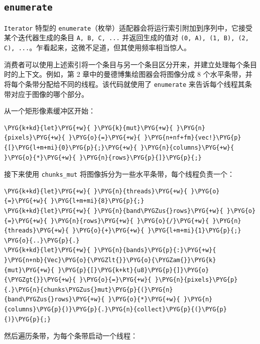 \subsection{\texttt{enumerate}}

\texttt{Iterator} 特型的 \texttt{enumerate}（枚举）适配器会将运行索引附加到序列中，它接受某个迭代器生成的条目 \texttt{A, B, C, ...} 并返回生成的值对 \texttt{(0, A), (1, B), (2, C), ...}。乍看起来，这微不足道，但其使用频率相当惊人。

消费者可以使用上述索引将一个条目与另一个条目区分开来，并建立处理每个条目时的上下文。例如，第 2 章中的曼德博集绘图器会将图像分成 8 个水平条带，并将每个条带分配给不同的线程。该代码就使用了 \texttt{enumerate} 来告诉每个线程其条带对应于图像的哪个部分。

从一个矩形像素缓冲区开始：

\begin{Verbatim}[commandchars=\\\{\},breaklines=true,breakanywhere=true,fontsize=\codefont,xleftmargin=17bp]
\PYG{k+kd}{let}\PYG{+w}{ }\PYG{k}{mut}\PYG{+w}{ }\PYG{n}{pixels}\PYG{+w}{ }\PYG{o}{=}\PYG{+w}{ }\PYG{n+nf+fm}{vec!}\PYG{p}{[}\PYG{l+m+mi}{0}\PYG{p}{;}\PYG{+w}{ }\PYG{n}{columns}\PYG{+w}{ }\PYG{o}{*}\PYG{+w}{ }\PYG{n}{rows}\PYG{p}{]}\PYG{p}{;}
\end{Verbatim}

接下来使用 \texttt{chunks\_mut} 将图像拆分为一些水平条带，每个线程负责一个：

\begin{Verbatim}[commandchars=\\\{\},breaklines=true,breakanywhere=true,fontsize=\codefont,xleftmargin=17bp]
\PYG{k+kd}{let}\PYG{+w}{ }\PYG{n}{threads}\PYG{+w}{ }\PYG{o}{=}\PYG{+w}{ }\PYG{l+m+mi}{8}\PYG{p}{;}
\PYG{k+kd}{let}\PYG{+w}{ }\PYG{n}{band\PYGZus{}rows}\PYG{+w}{ }\PYG{o}{=}\PYG{+w}{ }\PYG{n}{rows}\PYG{+w}{ }\PYG{o}{/}\PYG{+w}{ }\PYG{n}{threads}\PYG{+w}{ }\PYG{o}{+}\PYG{+w}{ }\PYG{l+m+mi}{1}\PYG{p}{;}
\PYG{o}{..}\PYG{p}{.}
\PYG{k+kd}{let}\PYG{+w}{ }\PYG{n}{bands}\PYG{p}{:}\PYG{+w}{ }\PYG{n+nb}{Vec}\PYG{o}{\PYGZlt{}}\PYG{o}{\PYGZam{}}\PYG{k}{mut}\PYG{+w}{ }\PYG{p}{[}\PYG{k+kt}{u8}\PYG{p}{]}\PYG{o}{\PYGZgt{}}\PYG{+w}{ }\PYG{o}{=}\PYG{+w}{ }\PYG{n}{pixels}\PYG{p}{.}\PYG{n}{chunks\PYGZus{}mut}\PYG{p}{(}\PYG{n}{band\PYGZus{}rows}\PYG{+w}{ }\PYG{o}{*}\PYG{+w}{ }\PYG{n}{columns}\PYG{p}{)}\PYG{p}{.}\PYG{n}{collect}\PYG{p}{(}\PYG{p}{)}\PYG{p}{;}
\end{Verbatim}

然后遍历条带，为每个条带启动一个线程：

